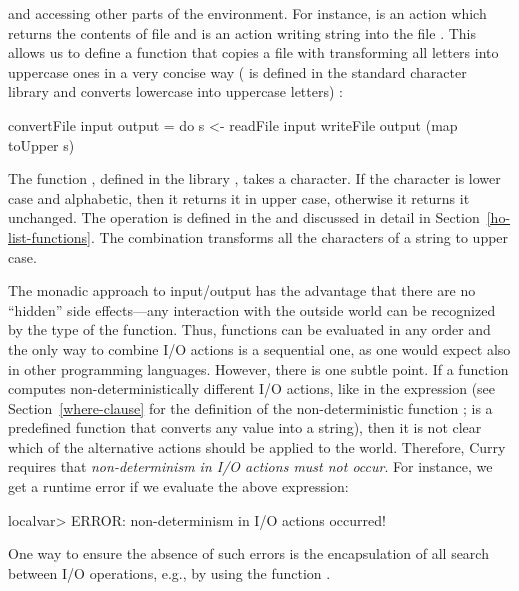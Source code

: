 and accessing other parts of the environment.
For instance, 
is an action which returns the contents
of file  and 
is an action writing string
 into the file . This allows us to define a function
that copies a file with transforming all letters into uppercase ones
in a very concise way (
is defined in the standard character library  and converts
lowercase into uppercase letters)
:
\begin{prog}
convertFile input output =
   do s <- readFile input
      writeFile output (map toUpper s)
\end{prog}
%
% 
The function , defined in the library ,
takes a character. If the character is lower case and alphabetic,
then it returns it in upper case, otherwise it returns it unchanged.
The operation  is defined in the 
and discussed in detail in Section~\ref{ho-list-functions}.
The combination  transforms all the characters
of a string to upper case.

The monadic approach to input/output has the advantage
that there are no ``hidden'' side effects---any interaction
with the outside world can be recognized by the  type of the
function. Thus, functions can be evaluated in any order
and the only way to combine I/O actions is a sequential one, as
one would expect also in other programming languages.
However, there is one subtle point. If a function computes
non-deterministically different I/O actions,
like in the expression 
(see Section~\ref{where-clause} for the definition
of the non-deterministic function ;
 is a predefined function that
converts any value into a string),
then it is not clear which of the alternative actions
should be applied to the world. Therefore, Curry requires
that \emph{non-determinism in I/O actions must not occur}.
For instance, we get a runtime error if we evaluate the
above expression:
\begin{prog}
localvar> 
ERROR: non-determinism in I/O actions occurred!
\end{prog}
%
One way to ensure the absence of such errors is the
encapsulation of all search between I/O operations, e.g.,
by using the function .

